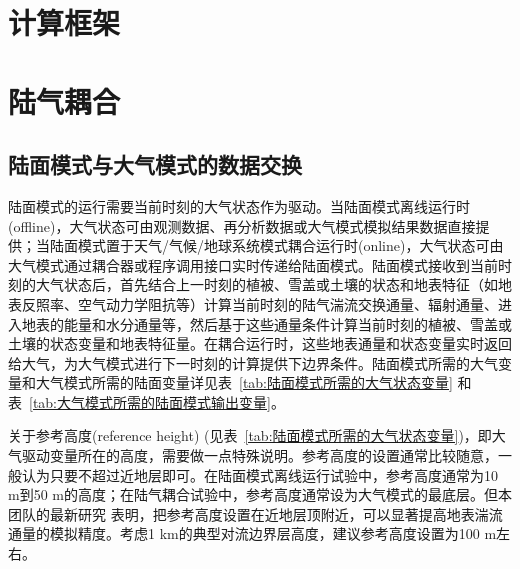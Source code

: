 \section{计算框架}\label{计算框架}



\section{陆气耦合}\label{陆气耦合}
\subsection{陆面模式与大气模式的数据交换}
陆面模式的运行需要当前时刻的大气状态作为驱动。当陆面模式离线运行时(offline)，大气状态可由观测数据、再分析数据或大气模式模拟结果数据直接提供；当陆面模式置于天气/气候/地球系统模式耦合运行时(online)，大气状态可由大气模式通过耦合器或程序调用接口实时传递给陆面模式。陆面模式接收到当前时刻的大气状态后，首先结合上一时刻的植被、雪盖或土壤的状态和地表特征（如地表反照率、空气动力学阻抗等）计算当前时刻的陆气湍流交换通量、辐射通量、进入地表的能量和水分通量等，然后基于这些通量条件计算当前时刻的植被、雪盖或土壤的状态变量和地表特征量。在耦合运行时，这些地表通量和状态变量实时返回给大气，为大气模式进行下一时刻的计算提供下边界条件。陆面模式所需的大气变量和大气模式所需的陆面变量详见表~\ref{tab:陆面模式所需的大气状态变量} 和表~\ref{tab:大气模式所需的陆面模式输出变量}。

关于参考高度(reference height) (见表~\ref{tab:陆面模式所需的大气状态变量})，即大气驱动变量所在的高度，需要做一点特殊说明。参考高度的设置通常比较随意，一般认为只要不超过近地层即可。在陆面模式离线运行试验中，参考高度通常为10 m到50 m的高度；在陆气耦合试验中，参考高度通常设为大气模式的最底层。但本团队的最新研究\citep{liu2023referenceheight} 表明，把参考高度设置在近地层顶附近，可以显著提高地表湍流通量的模拟精度。考虑1 km的典型对流边界层高度，建议参考高度设置为100 m左右。


